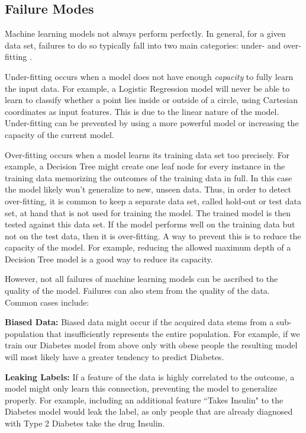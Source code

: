 \subsection{Failure Modes}
Machine learning models not always perform perfectly.
In general, for a given data set, failures to do so typically fall into two main categories: under- and over-fitting \cite{mlbook}.

Under-fitting occurs when a model does not have enough \emph{capacity} to fully learn the input data.
For example, a Logistic Regression model will never be able to learn to classify whether a point lies inside or outside of a circle, using Cartesian coordinates as input features.
This is due to the linear nature of the model.
Under-fitting can be prevented by using a more powerful model or increasing the capacity of the current model.

Over-fitting occurs when a model learns its training data set too precisely.
For example, a Decision Tree might create one leaf node for every instance in the training data memorizing the outcomes of the training data in full.
In this case the model likely won't generalize to new, unseen data.
Thus, in order to detect over-fitting, it is common to keep a separate data set, called hold-out or test data set, at hand that is not used for training the model.
The trained model is then tested against this data set.
If the model performs well on the training data but not on the test data, then it is over-fitting.
A way to prevent this is to reduce the capacity of the model.
For example, reducing the allowed maximum depth of a Decision Tree model is a good way to reduce its capacity.

However, not all failures of machine learning models can be ascribed to the quality of the model.
Failures can also stem from the quality of the data.
Common cases include:

\par \noindent \textbf{Biased Data:}
Biased data might occur if the acquired data stems from a sub-population that insufficiently represents the entire population.
For example, if we train our Diabetes model from above only with obese people the resulting model will most likely have a greater tendency to predict Diabetes.

\par \noindent \textbf{Leaking Labels:}
If a feature of the data is highly correlated to the outcome, a model might only learn this connection, preventing the model to generalize properly.
For example, including an additional feature ``Takes Insulin" to the Diabetes model would leak the label, as only people that are already diagnosed with Type 2 Diabetes take the drug Insulin.

